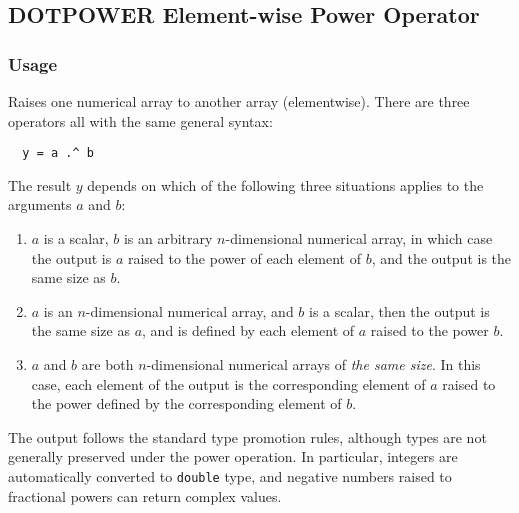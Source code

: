 %
%
%
\subsection{DOTPOWER Element-wise Power Operator}
\subsubsection{Usage}
Raises one numerical array to another array (elementwise).  There are three operators all with the same general syntax:
\begin{verbatim}
  y = a .^ b
\end{verbatim}
The result $y$ depends on which of the following three situations applies to the arguments $a$ and $b$:
\begin{enumerate}
  \item $a$ is a scalar, $b$ is an arbitrary $n$-dimensional numerical array, in which case the output is $a$ raised to the power of each element of $b$, and the output is the same size as $b$.
  \item $a$ is an $n$-dimensional numerical array, and $b$ is a scalar, then the output is the same size as $a$, and is defined by each element of $a$ raised to the power $b$.
  \item $a$ and $b$ are both $n$-dimensional numerical arrays of \emph{the same size}.  In this case, each element of the output is the corresponding element of $a$ raised to the power defined by the corresponding element of $b$.
\end{enumerate}
The output follows the standard type promotion rules, although types are not generally preserved under the power operation.  In particular, integers are automatically converted to \verb|double| type, and negative numbers raised to fractional powers can return complex values.
